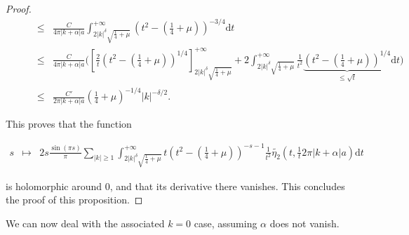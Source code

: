 \documentclass{jams-l}
\theoremstyle{definition}
\theoremstyle{remark}
\numberwithin{equation}{section}
\begin{document}
\begin{proof}
\[\begin{array}{lll}
                            \qquad & \scriptstyle \leqslant & \scriptstyle \frac{C}{4 \pi \left \vert k + \alpha \right \vert a} \int_{2 \left \vert k \right \vert^{\delta} \sqrt{\frac{1}{4} + \mu}}^{+ \infty} \left( t^2 - \left( \frac{1}{4} + \mu \right) \right)^{-3/4} \mathrm{d}t \\[1em]
                            
                            & \scriptstyle \leqslant & \scriptstyle \frac{C}{4 \pi \left \vert k + \alpha \right \vert a} \Big( \left[ \frac{2}{t} \left( t^2 - \left( \frac{1}{4} + \mu \right) \right)^{1/4} \right]_{2 \left \vert k \right \vert^{\delta} \sqrt{\frac{1}{4} + \mu}}^{+ \infty} + 2 \int_{2 \left \vert k \right \vert^{\delta} \sqrt{\frac{1}{4} + \mu}}^{+ \infty} \frac{1}{t^2} \underbrace{\scriptstyle \left( t^2 - \left( \frac{1}{4} + \mu \right) \right)^{1/4}}_{\scriptstyle \leqslant \sqrt{t}} \mathrm{d}t \Big) \\[0.5em]
                            
                            & \scriptstyle \leqslant & \scriptstyle \frac{C'}{2 \pi \left \vert k + \alpha \right \vert a} \left( \frac{1}{4} + \mu \right)^{-1/4} \left \vert k \right \vert^{-\delta/2}.
                        \end{array} \]
                    
                    \noindent This proves that the function
                    
                    \[ \begin{array}{lll}
                            s & \longmapsto & 2s \frac{\sin \left( \pi s \right)}{\pi} \sum\limits_{\left \vert k \right \vert \geqslant 1} \int_{2 \left \vert k \right \vert^{\delta} \sqrt{\frac{1}{4} + \mu}}^{+ \infty} t \left( t^2 - \left( \frac{1}{4} + \mu \right) \right)^{-s-1} \frac{1}{t^2} \widetilde{\eta_2} \left( t, \frac{1}{t} 2 \pi \left \vert k + \alpha \right \vert a \right) \mathrm{d}t
                        \end{array} \]
                    
                    \noindent is holomorphic around $0$, and that its derivative there vanishes. This concludes the proof of this proposition.
                
                \end{proof}
                
                We can now deal with the associated $k = 0$ case, assuming $\alpha$ does not vanish.
                
\end{document}
